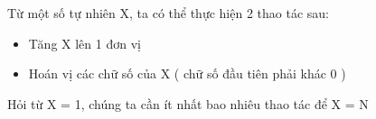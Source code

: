 Từ một số tự nhiên X, ta có thể thực hiện 2 thao tác sau:
\begin{itemize}
	\item Tăng X lên 1 đơn vị
	\item Hoán vị các chữ số của X ( chữ số đầu tiên phải khác 0 )
\end{itemize}

Hỏi từ X = 1, chúng ta cần ít nhất bao nhiêu thao tác để X = N